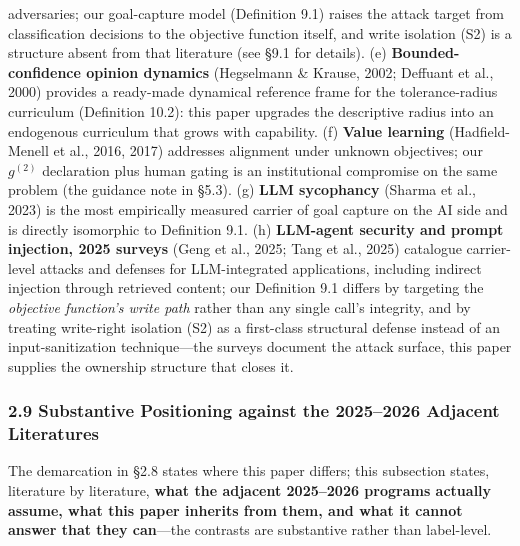 \documentclass[
  11pt]{article}
\begin{document}
adversaries; our goal-capture model (Definition 9.1) raises the attack
target from classification decisions to the objective function itself,
and write isolation (S2) is a structure absent from that literature (see
§9.1 for details). (e) \textbf{Bounded-confidence opinion dynamics}
(Hegselmann \& Krause, 2002; Deffuant et al., 2000) provides a
ready-made dynamical reference frame for the tolerance-radius curriculum
(Definition 10.2): this paper upgrades the descriptive radius into an
endogenous curriculum that grows with capability. (f) \textbf{Value
learning} (Hadfield-Menell et al., 2016, 2017) addresses alignment under
unknown objectives; our \(g^{(2)}\) declaration plus human gating is an
institutional compromise on the same problem (the guidance note in
§5.3). (g) \textbf{LLM sycophancy} (Sharma et al., 2023) is the most
empirically measured carrier of goal capture on the AI side and is
directly isomorphic to Definition 9.1. (h) \textbf{LLM-agent security
and prompt injection, 2025 surveys} (Geng et al., 2025; Tang et al.,
2025) catalogue carrier-level attacks and defenses for LLM-integrated
applications, including indirect injection through retrieved content;
our Definition 9.1 differs by targeting the \emph{objective function's
write path} rather than any single call's integrity, and by treating
write-right isolation (S2) as a first-class structural defense instead
of an input-sanitization technique---the surveys document the attack
surface, this paper supplies the ownership structure that closes it.

\subsubsection{2.9 Substantive Positioning against the 2025--2026
Adjacent
Literatures}\label{substantive-positioning-against-the-20252026-adjacent-literatures}

The demarcation in §2.8 states where this paper differs; this subsection
states, literature by literature, \textbf{what the adjacent 2025--2026
programs actually assume, what this paper inherits from them, and what
it cannot answer that they can}---the contrasts are substantive rather
than label-level.
\end{document}
